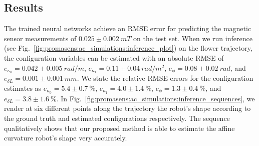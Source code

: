 \subsection{Results}\label{sub:promasens:ac_simulations:results}
The trained neural networks achieve an RMSE error for predicting the magnetic sensor measurements of $0.025 \pm 0.002 \: \si{mT}$ on the test set.
When we run inference (see Fig.~\ref{fig:promasens:ac_simulations:inference_plot}) on the flower trajectory, the configuration variables can be estimated with an absolute RMSE of $e_{\kappa_0} = 0.042 \pm 0.005 \: \si{rad \per m}$, $e_{\kappa_1} = 0.11 \pm 0.04 \: \si{rad \per m^2}$, $e_{\phi} = 0.08 \pm 0.02 \: \si{rad}$, and $e_{\delta L} = 0.001 \pm 0.001 \: \si{mm}$. 
We state the relative RMSE errors for the configuration estimates as $e_{\kappa_0} = 5.4 \pm 0.7 \: \si{\percent}$, $e_{\kappa_1} = 4.0 \pm 1.4 \: \si{\percent}$, $e_{\phi} = 1.3 \pm 0.4 \: \si{\percent}$, and $e_{\delta L} = 3.8 \pm 1.6 \: \si{\percent}$.
In Fig.~\ref{fig:promasens:ac_simulations:inference_sequences}, we render at six different points along the trajectory the robot's shape according to the ground truth and estimated configurations respectively.
The sequence qualitatively shows that our proposed method is able to estimate the affine curvature robot's shape very accurately.
